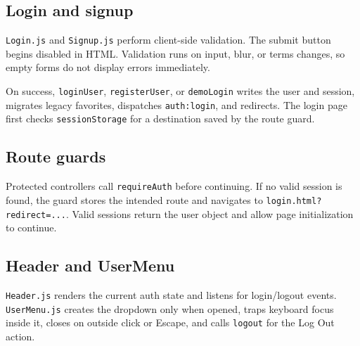 \documentclass[10pt]{article}
\newcommand{\code}[1]{\texttt{#1}}
\begin{document}
\subsection{Login and signup}

\code{Login.js} and \code{Signup.js} perform client-side validation. The submit button begins disabled in HTML. Validation runs on input, blur, or terms changes, so empty forms do not display errors immediately.

On success, \code{loginUser}, \code{registerUser}, or \code{demoLogin} writes the user and session, migrates legacy favorites, dispatches \code{auth:login}, and redirects. The login page first checks \code{sessionStorage} for a destination saved by the route guard.

\subsection{Route guards}

Protected controllers call \code{requireAuth} before continuing. If no valid session is found, the guard stores the intended route and navigates to \code{login.html?redirect=...}. Valid sessions return the user object and allow page initialization to continue.

\subsection{Header and UserMenu}

\code{Header.js} renders the current auth state and listens for login/logout events. \code{UserMenu.js} creates the dropdown only when opened, traps keyboard focus inside it, closes on outside click or Escape, and calls \code{logout} for the Log Out action.

\end{document}
